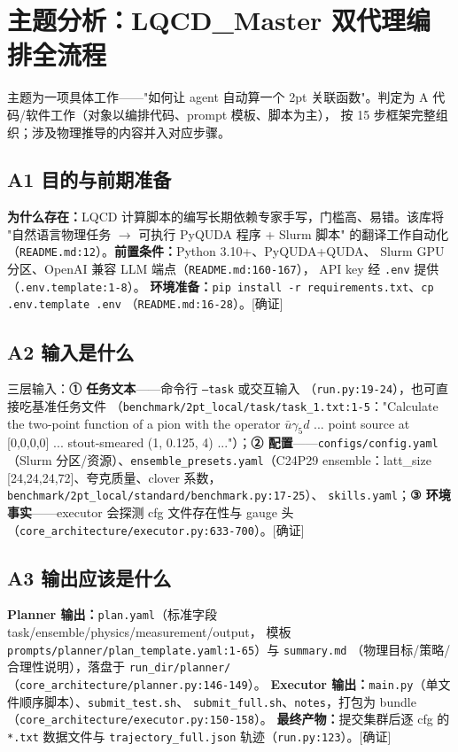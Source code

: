 \documentclass[UTF8]{ctexart}
\begin{document}
\section{主题分析：LQCD\_Master 双代理编排全流程}

主题为一项具体工作——"如何让 agent 自动算一个 2pt 关联函数"。判定为
\textcolor{struct}{A 代码/软件工作}（对象以编排代码、prompt 模板、脚本为主），
按 15 步框架完整组织；涉及物理推导的内容并入对应步骤。

\subsection{A1 目的与前期准备}

\textbf{为什么存在：}LQCD 计算脚本的编写长期依赖专家手写，门槛高、易错。该库将
"自然语言物理任务 $\rightarrow$ 可执行 PyQUDA 程序 + Slurm 脚本" 的翻译工作自动化
（\texttt{\nolinkurl{README.md:12}}）。\textbf{前置条件：}Python 3.10+、PyQUDA+QUDA、
Slurm GPU 分区、OpenAI 兼容 LLM 端点（\texttt{\nolinkurl{README.md:160-167}}），
API key 经 \texttt{.env} 提供（\texttt{\nolinkurl{.env.template:1-8}}）。
\textbf{环境准备：}\texttt{pip install -r requirements.txt}、\texttt{cp .env.template .env}
（\texttt{\nolinkurl{README.md:16-28}}）。[确证]

\subsection{A2 输入是什么}

三层输入：\textbf{① 任务文本}——命令行 \texttt{--task} 或交互输入
（\texttt{\nolinkurl{run.py:19-24}}），也可直接吃基准任务文件
（\texttt{\nolinkurl{benchmark/2pt_local/task/task_1.txt:1-5}}："Calculate the two-point
function of a pion with the operator $\bar u \gamma_5 d$ ... point source at [0,0,0,0]
... stout-smeared (1, 0.125, 4) ..."）；\textbf{② 配置}——\texttt{configs/config.yaml}
（Slurm 分区/资源）、\texttt{ensemble\_presets.yaml}（C24P29 ensemble：latt\_size
[24,24,24,72]、夸克质量、clover 系数，\texttt{\nolinkurl{benchmark/2pt_local/standard/benchmark.py:17-25}}）、
\texttt{skills.yaml}；\textbf{③ 环境事实}——executor 会探测 cfg 文件存在性与 gauge 头
（\texttt{\nolinkurl{core_architecture/executor.py:633-700}}）。[确证]

\subsection{A3 输出应该是什么}

\textbf{Planner 输出：}\texttt{plan.yaml}（标准字段 task/ensemble/physics/measurement/output，
模板 \texttt{\nolinkurl{prompts/planner/plan_template.yaml:1-65}}）与 \texttt{summary.md}
（物理目标/策略/合理性说明），落盘于 \texttt{run\_dir/planner/}
（\texttt{\nolinkurl{core_architecture/planner.py:146-149}}）。
\textbf{Executor 输出：}\texttt{main.py}（单文件顺序脚本）、\texttt{submit\_test.sh}、
\texttt{submit\_full.sh}、\texttt{notes}，打包为 bundle（\texttt{\nolinkurl{core_architecture/executor.py:150-158}}）。
\textbf{最终产物：}提交集群后逐 cfg 的 \texttt{*.txt} 数据文件与 \texttt{trajectory\_full.json}
轨迹（\texttt{\nolinkurl{run.py:123}}）。[确证]
\end{document}
